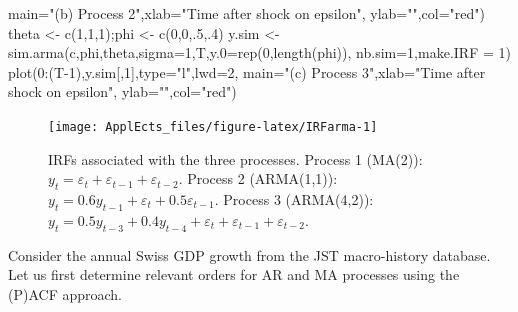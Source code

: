 \documentclass[
  12pt,
]{book}
\newenvironment{Shaded}{\begin{snugshade}}{\end{snugshade}}
\newcommand{\AttributeTok}[1]{\textcolor[rgb]{0.77,0.63,0.00}{#1}}
\newcommand{\DecValTok}[1]{\textcolor[rgb]{0.00,0.00,0.81}{#1}}
\newcommand{\FunctionTok}[1]{\textcolor[rgb]{0.00,0.00,0.00}{#1}}
\newcommand{\NormalTok}[1]{#1}
\newcommand{\OtherTok}[1]{\textcolor[rgb]{0.56,0.35,0.01}{#1}}
\newcommand{\SpecialCharTok}[1]{\textcolor[rgb]{0.00,0.00,0.00}{#1}}
\newcommand{\StringTok}[1]{\textcolor[rgb]{0.31,0.60,0.02}{#1}}
\theoremstyle{definition}
\theoremstyle{definition}
\theoremstyle{definition}
\theoremstyle{definition}
\theoremstyle{remark}
\begin{document}
\begin{Shaded}
\begin{Highlighting}[]
     \AttributeTok{main=}\StringTok{"(b) Process 2"}\NormalTok{,}\AttributeTok{xlab=}\StringTok{"Time after shock on epsilon"}\NormalTok{,}
     \AttributeTok{ylab=}\StringTok{""}\NormalTok{,}\AttributeTok{col=}\StringTok{"red"}\NormalTok{)}
\NormalTok{theta }\OtherTok{\textless{}{-}} \FunctionTok{c}\NormalTok{(}\DecValTok{1}\NormalTok{,}\DecValTok{1}\NormalTok{,}\DecValTok{1}\NormalTok{);phi }\OtherTok{\textless{}{-}} \FunctionTok{c}\NormalTok{(}\DecValTok{0}\NormalTok{,}\DecValTok{0}\NormalTok{,.}\DecValTok{5}\NormalTok{,.}\DecValTok{4}\NormalTok{)}
\NormalTok{y.sim }\OtherTok{\textless{}{-}} \FunctionTok{sim.arma}\NormalTok{(c,phi,theta,}\AttributeTok{sigma=}\DecValTok{1}\NormalTok{,T,}\AttributeTok{y.0=}\FunctionTok{rep}\NormalTok{(}\DecValTok{0}\NormalTok{,}\FunctionTok{length}\NormalTok{(phi)),}
                  \AttributeTok{nb.sim=}\DecValTok{1}\NormalTok{,}\AttributeTok{make.IRF =} \DecValTok{1}\NormalTok{)}
\FunctionTok{plot}\NormalTok{(}\DecValTok{0}\SpecialCharTok{:}\NormalTok{(T}\DecValTok{{-}1}\NormalTok{),y.sim[,}\DecValTok{1}\NormalTok{],}\AttributeTok{type=}\StringTok{"l"}\NormalTok{,}\AttributeTok{lwd=}\DecValTok{2}\NormalTok{,}
     \AttributeTok{main=}\StringTok{"(c) Process 3"}\NormalTok{,}\AttributeTok{xlab=}\StringTok{"Time after shock on epsilon"}\NormalTok{,}
     \AttributeTok{ylab=}\StringTok{""}\NormalTok{,}\AttributeTok{col=}\StringTok{"red"}\NormalTok{)}
\end{Highlighting}
\end{Shaded}

\begin{figure}
\texttt{[image: ApplEcts\_files/figure-latex/IRFarma-1]} \caption{IRFs associated with the three processes. Process 1 (MA(2)): $y_t = \varepsilon_t + \varepsilon_{t-1} + \varepsilon_{t-2}$. Process 2 (ARMA(1,1)): $y_{t}=0.6y_{t-1} + \varepsilon_t + 0.5\varepsilon_{t-1}$. Process 3 (ARMA(4,2)): $y_{t}=0.5y_{t-3} + 0.4y_{t-4} + \varepsilon_t + \varepsilon_{t-1} + \varepsilon_{t-2}$.}\label{fig:IRFarma}
\end{figure}

Consider the annual Swiss GDP growth from the JST macro-history database. Let us first determine relevant orders for AR and MA processes using the (P)ACF approach.
\end{document}
